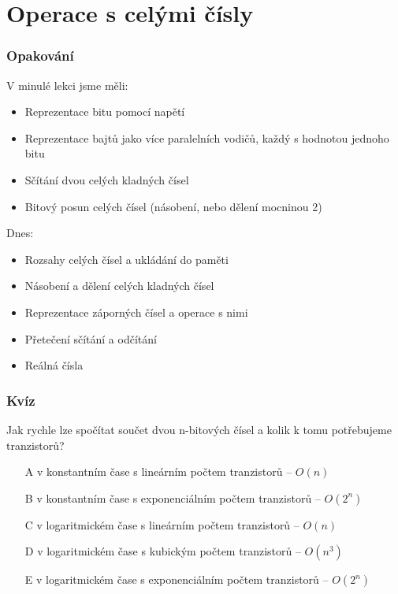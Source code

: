 \documentclass{beamer}
\subtitle{Lekce 02. Reprezentace čísel}
\author{Petr Štěpán\\ \small\texttt{stepan@fel.cvut.cz}}
\begin{document}
\maketitle

\section{Operace s celými čísly}

\begin{frame}
\frametitle{Opakování}
V minulé lekci jsme měli:
\begin{itemize}
\item Reprezentace bitu pomocí napětí
\item Reprezentace bajtů jako více paralelních vodičů, každý s hodnotou jednoho bitu
\item Sčítání dvou celých kladných čísel
\item Bitový posun celých čísel (násobení, nebo dělení mocninou 2)
\end{itemize}

Dnes:
\begin{itemize}
\item Rozsahy celých čísel a ukládání do paměti
\item Násobení a dělení celých kladných čísel 
\item Reprezentace záporných čísel a operace s nimi
\item Přetečení sčítání a odčítání
\item Reálná čísla
\end{itemize}
\end{frame}


\begin{frame}
\frametitle{Kvíz}
Jak rychle lze spočítat součet dvou n-bitových čísel a kolik k tomu potřebujeme tranzistorů?
\begin{itemize}
\item[A] v konstantním čase s lineárním počtem tranzistorů -- $O(n)$
\item[B] v konstantním čase s exponenciálním počtem tranzistorů -- $O(2^n)$
\item[C] v logaritmickém čase s lineárním počtem tranzistorů -- $O(n)$
\item[D] v logaritmickém čase s kubickým počtem tranzistorů -- $O(n^3)$
\item[E] v logaritmickém čase s exponenciálním počtem tranzistorů -- $O(2^n)$
\end{itemize}
\end{frame}
\end{document}
